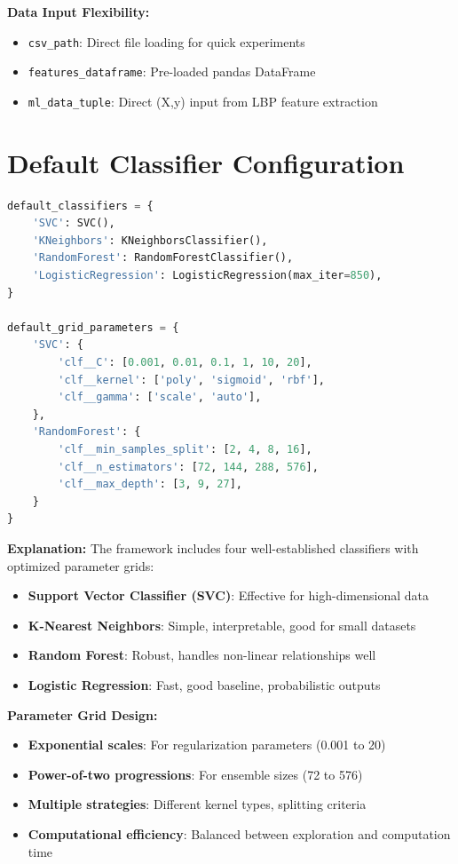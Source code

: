 \documentclass[10pt]{book}
\begin{document}
\textbf{Data Input Flexibility:}
\begin{itemize}
\item \texttt{csv\_path}: Direct file loading for quick experiments
\item \texttt{features\_dataframe}: Pre-loaded pandas DataFrame
\item \texttt{ml\_data\_tuple}: Direct (X,y) input from LBP feature extraction
\end{itemize}

\section{Default Classifier Configuration}

\begin{lstlisting}[language=Python]
default_classifiers = {
    'SVC': SVC(),
    'KNeighbors': KNeighborsClassifier(),
    'RandomForest': RandomForestClassifier(),
    'LogisticRegression': LogisticRegression(max_iter=850),
}

default_grid_parameters = {
    'SVC': {
        'clf__C': [0.001, 0.01, 0.1, 1, 10, 20],
        'clf__kernel': ['poly', 'sigmoid', 'rbf'],
        'clf__gamma': ['scale', 'auto'],
    },
    'RandomForest': {
        'clf__min_samples_split': [2, 4, 8, 16],
        'clf__n_estimators': [72, 144, 288, 576],
        'clf__max_depth': [3, 9, 27],
    }
}
\end{lstlisting}

\textbf{Explanation:}
The framework includes four well-established classifiers with optimized parameter grids:

\begin{itemize}
\item \textbf{Support Vector Classifier (SVC)}: Effective for high-dimensional data
\item \textbf{K-Nearest Neighbors}: Simple, interpretable, good for small datasets
\item \textbf{Random Forest}: Robust, handles non-linear relationships well
\item \textbf{Logistic Regression}: Fast, good baseline, probabilistic outputs
\end{itemize}

\textbf{Parameter Grid Design:}
\begin{itemize}
\item \textbf{Exponential scales}: For regularization parameters (0.001 to 20)
\item \textbf{Power-of-two progressions}: For ensemble sizes (72 to 576)
\item \textbf{Multiple strategies}: Different kernel types, splitting criteria
\item \textbf{Computational efficiency}: Balanced between exploration and computation time
\end{itemize}
\end{document}
